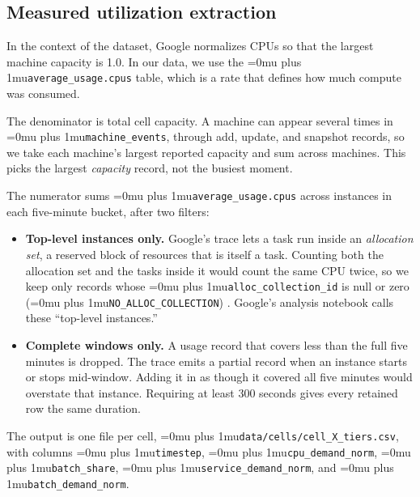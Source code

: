 \documentclass[12pt]{article}
\newcommand{\codepath}[1]{{\Urlmuskip=0mu plus 1mu\relax\nolinkurl{#1}}}
\begin{document}
\subsection{Measured utilization extraction}
\label{subsec:clusterdata-utilization}

In the context of the dataset, Google normalizes CPUs so that the largest machine capacity is 1.0. In our data, we use the \codepath{average_usage.cpus} table, which is a rate that defines how much compute was consumed. 

The denominator is total cell capacity. A machine can appear several times in \codepath{machine_events}, through add, update, and snapshot records, so we take each machine's largest reported capacity and sum across machines. This picks the largest \emph{capacity} record, not the busiest moment.

The numerator sums \codepath{average_usage.cpus} across instances in each five-minute bucket, after two filters:

\begin{itemize}
  \item \textbf{Top-level instances only.} Google's trace lets a task run         inside an \emph{allocation set}, a reserved block of resources that is         itself a task. Counting both the allocation set and the tasks inside it         would count the same CPU twice, so we keep only records whose \codepath{alloc_collection_id} is null or zero (\codepath{NO_ALLOC_COLLECTION}) \cite{googleTraceFormatV3}. Google's analysis notebook calls these ``top-level instances.''
  \item \textbf{Complete windows only.} A usage record that covers less than the full five minutes is dropped. The trace emits a partial record when an instance starts or stops mid-window. Adding it in as though it covered all five minutes would overstate that instance. Requiring at least 300 seconds gives every retained row the same duration. 
\end{itemize}

The output is one file per cell, \codepath{data/cells/cell_X_tiers.csv}, with columns \codepath{timestep}, \codepath{cpu_demand_norm}, \codepath{batch_share}, \codepath{service_demand_norm}, and \codepath{batch_demand_norm}.
\end{document}
